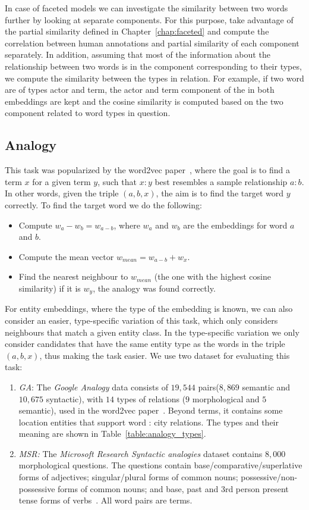 In case of faceted models we can investigate the similarity between two words further by looking at separate components. For this purpose, take advantage of the partial similarity defined in Chapter~\ref{chap:faceted} and compute the correlation between human annotations and partial similarity of each component separately. In addition, assuming that most of the information about the relationship between two words is in the component corresponding to their types, we compute the similarity between the types in relation. For example, if two word are of types actor and term, the actor and term component of the in both embeddings are kept and the cosine similarity is computed based on the two component related to word types in question. 
\subsection{Analogy}
This task was popularized by the word2vec paper~, where the goal is to find a term $x$ for a given term $y$, such that  $x : y$ best resembles a sample relationship $a : b$. In other words, given the triple $(a,b,x)$, the aim is to find the target word $y$ correctly. To find the target word we do the following:  
\begin{itemize}
    \item Compute $w_a-w_b=w_{a-b}$, where $w_a$ and $w_b$ are the embeddings for word $a$ and $b$. 
    \item  Compute the mean vector $w_{mean}=w_{a-b}+w_x$.
    \item  Find the nearest neighbour to $w_{mean}$ (the one with the highest cosine similarity) if it is $w_y$, the analogy was found correctly.
  \end{itemize}
  \noindent
For entity embeddings, where the type of the embedding is known, we can also consider an easier, type-specific variation of this task, which only considers neighbours that match a given entity class. In the type-specific variation we only consider candidates that have the same entity type as the words in the triple $(a,b,x)$, thus making the task easier. We use two dataset for evaluating this task: 
\begin{enumerate}
 \item \emph{GA}: The \emph{Google Analogy} data consists of $19,544$ pairs($8,869$ semantic and $10,675$ syntactic), with $14$ types of relations ($9$ morphological and $5$ semantic), used in the word2vec paper~. Beyond terms, it contains some location entities that support word : city relations. The types and their meaning are shown in Table~\ref{table:analogy_types}.
\item \emph{MSR:} The \emph{Microsoft Research Syntactic analogies} dataset contains $8,000$ morphological questions. The questions contain base/comparative/superlative forms of adjectives; singular/plural forms of common nouns; possessive/non-possessive forms of common nouns; and base, past and 3rd person present tense forms of verbs~\cite{DBLP:conf/naacl/MikolovYZ13}. All word pairs are terms.
\end{enumerate}


